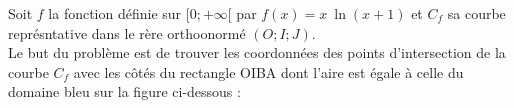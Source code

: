 \documentclass[a4paper, 12pt]{article}
\begin{document}
Soit $f$ la fonction définie sur $[0;+\infty[$ par $f(x) = x\ \ln \left(x + 1 \right)$ et $C_f$ sa courbe représntative dans le rère orthoonormé $(O;I;J)$.
\\
Le but du problème est de trouver les coordonnées des points d'intersection de la courbe $C_f$ avec les côtés du rectangle OIBA dont l'aire est égale à celle du domaine bleu sur la figure ci-dessous :
\\
%    
\end{document}
